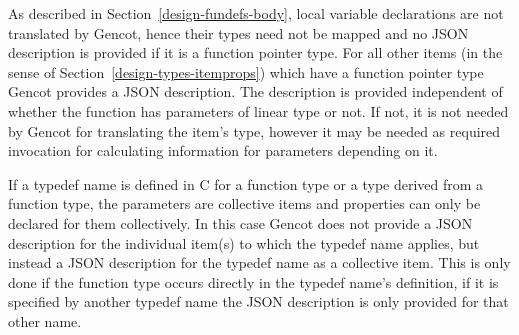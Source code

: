 As described in Section~\ref{design-fundefs-body}, local variable declarations are not translated by Gencot, hence
their types need not be mapped and no JSON description is provided if it is a function pointer type. 
For all other items (in the sense of Section~\ref{design-types-itemprops}) which have a function pointer type Gencot 
provides a JSON description. The
description is provided independent of whether the function has parameters of linear type or not. If not, it is
not needed by Gencot for translating the item's type, however it may be needed as required invocation for
calculating information for parameters depending on it.

If a typedef name is defined in C for a function type or a type derived from a function type, the parameters are collective items
and properties can only be declared for them collectively. In this case Gencot does not provide a JSON description for the individual
item(s) to which the typedef name applies, but instead a JSON description for the typedef name as a collective item. This 
is only done if the function type occurs directly in the typedef name's definition, if it is specified by another typedef
name the JSON description is only provided for that other name.

